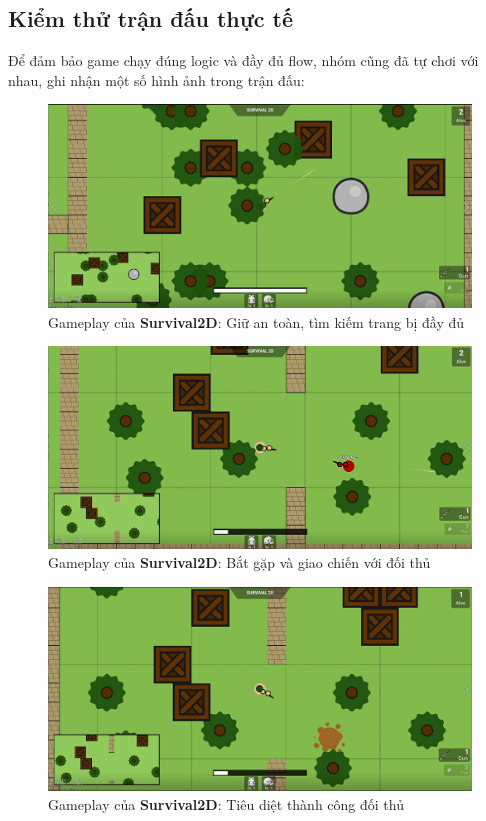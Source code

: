 \documentclass[12pt,a4paper]{article}
\begin{document}
  \subsection{Kiểm thử trận đấu thực tế}
   Để đảm bảo game chạy đúng logic và đầy đủ flow, nhóm cũng đã tự chơi với nhau, ghi nhận một số hình ảnh trong trận đấu:
  \begin{figure}[H]
      \centering
      \includegraphics[width=\textwidth]{Img/game_screen_shoot/fight-3.png}
      \caption{Gameplay của \textbf{Survival2D}: Giữ an toàn, tìm kiếm trang bị đầy đủ}
  \end{figure}

  \begin{figure}[H]
      \centering
      \includegraphics[width=\textwidth]{Img/game_screen_shoot/fight-2.png}
      \caption{Gameplay của \textbf{Survival2D}: Bắt gặp và giao chiến với đối thủ}
  \end{figure}

  \begin{figure}[H]
      \centering
      \includegraphics[width=\textwidth]{Img/game_screen_shoot/dead.png}
      \caption{Gameplay của \textbf{Survival2D}: Tiêu diệt thành công đối thủ}
  \end{figure}
\end{document}

